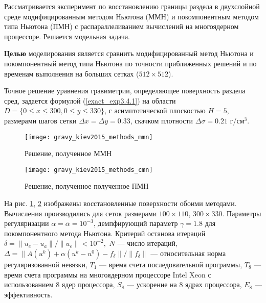 Рассматривается эксперимент по восстановлению границы раздела в двухслойной среде модифицированным методом Ньютона (ММН) и покомпонентным методом типа Ньютона (ПМН) с распараллеливанием вычислений на многоядерном процессоре. Решается модельная задача.

{\bfseries Целью} моделирования является сравнить модифицированный метод Ньютона и покомпонентный метод типа Ньютона по точности приближенных решений и по временам выполнения на больших сетках ($512 \times 512$).

 Точное решение уравнения гравиметрии, определяющее поверхность раздела сред, задается формулой (\ref{exact_exp3.4.1}) на области $D=\{0\le x\le 300, 0\le y\le 330\}$, с асимптотической плоскостью $  H=5$, размерами шагов сетки $\Delta x=\Delta y=0.33$, скачком плотности $\Delta\sigma=0.21$ г/см$^3$.
\begin{figure}[H]
	\centering
	\texttt{[image: gravy\_kiev2015\_methods\_mmn]}
	\caption{Решение, полученное ММН}
	\label{fig:gravy_kiev2015_methods_mmn}
\end{figure}
\begin{figure}[h]
	\centering
	\texttt{[image: gravy\_kiev2015\_methods\_cmn]}
	\caption{Решение, полученное полученное ПМН}
	\label{fig:gravy_kiev2015_methods_cmn}
\end{figure}
На рис. \ref{fig:gravy_kiev2015_methods_mmn}, \ref{fig:gravy_kiev2015_methods_cmn} изображены восстановленные поверхности обоими методами. Вычисления производились для сеток размерами $100\times 110$, $300\times 330$. Параметры регуляризации $\alpha=\bar{\alpha}=10^{-3}$, демпфирующий параметр $\gamma=1.8$ для покомпонентного метода Ньютона. Критерий останова итераций $\delta=\|u_e-u_a\|/\|u_e\|<10^{-2},$ $N$ --- число итераций, 
$\Delta=\|A(u^k)+\alpha(u^k-u^0)-f_\delta\|/\|f_\delta\|$ --- относительная норма регуляризованной невязки, $T_1$ --- время счета последовательной программы, $T_8$ --- время счета программы на многоядерном процессоре Intel Xeon с использованием 8 ядер процессора, $S_8$ --- ускорение на 8 ядрах процессора, $E_8$ --- эффективность.
